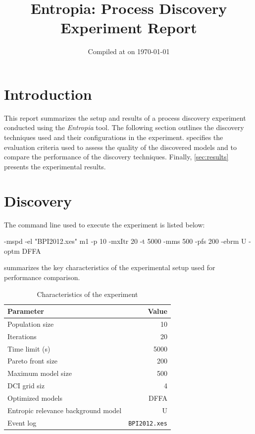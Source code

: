 \documentclass{article}
\begin{document}
\date{Compiled at {\ampmtime} on {\today}}
\title{Entropia: Process Discovery Experiment Report}
\maketitle
\section{Introduction}
This report summarizes the setup and results of a process discovery experiment conducted using the \textsl{Entropia}
tool.
The following section outlines the discovery techniques used and their configurations in the experiment.
 specifies the evaluation criteria used to assess the quality of the discovered models and to compare the performance of the discovery techniques.
Finally, \cref{sec:results} presents the experimental results.
\section{Discovery}
The command line used to execute the experiment is listed below:
\begin{justify}
 -mspd -el "BPI2012.xes"  m1 -p 10 -mxItr 20 -t 5000 -mms 500 -pfs 200 -ebrm U - optm DFFA 
\end{justify}\noindent
{} summarizes the key characteristics of the experimental setup used for performance comparison.
\begin{table}[h!] 
\centering 
\caption{Characteristics of the experiment} 
\label{tbl:experiment} 
\setlength{\tabcolsep}{6pt} %
\fontsize{9}{11}\selectfont 
\begin{tabular}{@{}lr@{}} 
\toprule 
\textbf{Parameter} & \textbf{Value} \\ 
\midrule
Population size &10\\ 
Iterations &20\\ 
Time limit (s) &5000\\ 
Pareto front size &200\\ 
Maximum model size &500\\ 
DCI grid siz &4\\ 
Optimized models &DFFA\\ 
Entropic relevance background model &U\\ 
Event log & \texttt{BPI2012.xes} \\ 
\bottomrule 
\end{tabular}
\end{table} 
\noindent 
\end{document}
